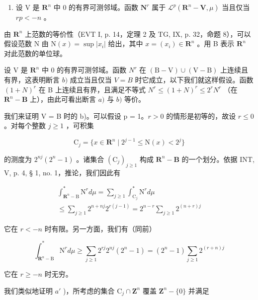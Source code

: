 \begin{enumerate}
\def\labelenumi{\alph{enumi})}
\setcounter{enumi}{1}
\tightlist
\item
  设 V 是 \(\mathbf{R}^{n}\) 中 0 的有界可测邻域。函数 \(\mathbf{N}^{r}\) 属于 \(\mathcal{L}^{p}(\mathbf{R}^{n}-\mathbf{V},\mu)\) 当且仅当 \(rp<-n\) 。
\end{enumerate}

由 \(\mathbf{R}^{n}\) 上范数的等价性（EVT I, p. 14，定理 2 及 TG, IX, p. 32，命题 8），可以假设范数 N 由 \(\mathrm{N}(x)=\sup|x_{i}|\) 给出，其中 \(x=(x_{i})\in\mathbf{R}^{n}\) 。用 B 表示 \(\mathbf{R}^{n}\) 对此范数的单位球。

设 V 是 \(\mathbf{R}^n\) 中 0 的有界可测邻域。函数 \(N^r\) 在 \((\mathrm{B - V})\cup (\mathrm{V - B})\) 上连续且有界，这表明断言 \(b)\) 成立当且仅当 \(V = B\) 时它成立，以下我们就这样假设。函数 \((1 + N)^r\) 在 B 上连续且有界，且满足不等式 \(N^r\leqslant (1 + N)^r\leqslant 2^r N^r\) （在 \(\mathbf{R}^n -\mathbf{B}\) 上），由此可看出断言 \(a)\) 与 \(b)\) 等价。

我们来证明 V = B 时的 b)。可以假设 p = 1。\(r > 0\) 的情形是初等的，故设 \(r \leqslant 0\) 。对每个整数 \(j \geqslant 1\) ，可积集

\[
\mathrm{C} _ {j} = \{x \in \mathbf {R} ^ {n} \mid 2 ^ {j - 1} \leqslant \mathrm{N} (x) <   2 ^ {j} \}
\]

的测度为 \(2^{nj}(2^n - 1)\) 。诸集合 \((\mathrm{C}_j)_{j \geqslant 1}\) 构成 \(\mathbf{R}^n - \mathbf{B}\) 的一个划分。依据 INT, V, p. 4, § 1, no. 1，推论，我们因此有

\[
\begin{array}{c} \int_ {\mathbf {R} ^ {n} - \mathrm{B}} ^ {*} \mathrm{N} ^ {r} d \mu = \sum_ {j \geqslant 1} \int_ {\mathrm{C} _ {j}} ^ {*} \mathrm{N} ^ {r} d \mu \\ \leqslant \sum_ {j \geqslant 1} 2 ^ {n + n j} 2 ^ {r (j - 1)} = 2 ^ {n - r} \sum_ {j \geqslant 1} 2 ^ {(n + r) j} \end{array}
\]

它在 \(r < -n\) 时有限。另一方面，我们有（同前）

\[
\int_ {\mathbf {R} ^ {n} - \mathrm{B}} ^ {*} \mathrm{N} ^ {r} d \mu \geqslant \sum_ {j \geqslant 1} 2 ^ {r j} 2 ^ {n j} (2 ^ {n} - 1) = (2 ^ {n} - 1) \sum_ {j \geqslant 1} 2 ^ {(r + n) j}
\]

它在 \(r \geqslant -n\) 时无穷。

我们类似地证明 \(a'\) )，所考虑的集合 \(\mathrm{C}_{j} \cap \mathbf{Z}^{n}\) 覆盖 \(\mathbf{Z}^{n} - \{0\}\) 并满足

